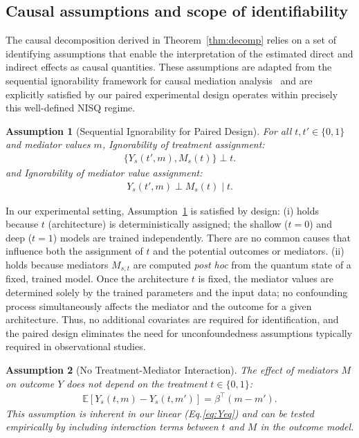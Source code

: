 \documentclass[
    reprint,
    amsmath, amssymb,
    aps,
    floatfix,
    nofootinbib
]{revtex4-1}
\newtheorem{assumption}{Assumption}
\begin{document}
\subsection{Causal assumptions and scope of identifiability}
\label{subsec:assumptions}

The causal decomposition derived in Theorem~\ref{thm:decomp} relies on a set of identifying assumptions that enable the interpretation of the estimated direct and indirect effects as causal quantities. These assumptions are adapted from the sequential ignorability framework for causal mediation analysis~\cite{imai2010general} and are explicitly satisfied by our paired experimental design operates within precisely this well-defined NISQ regime. \cite{chen2023complexity}

\begin{assumption}[Sequential Ignorability for Paired Design]
\label{ass:SI}
For all $t, t' \in \{0,1\}$ and mediator values $m$,
Ignorability of treatment assignment:
    \begin{align*}
        \{Y_{s}(t', m), M_{s}(t)\} \perp t.
    \end{align*}
and  Ignorability of mediator value assignment:
    \begin{align*}
        Y_{s}(t', m) \perp M_{s}(t) \mid  t.
    \end{align*}
\end{assumption}
In our experimental setting, Assumption~\ref{ass:SI} is satisfied by design:  (i) holds because $t$ (architecture) is deterministically assigned; the shallow ($t=0$) and deep ($t=1$) models are trained independently. There are no common causes that influence both the assignment of $t$ and the potential outcomes or mediators. (ii) holds because mediators $M_{s,t}$ are computed \textit{post hoc} from the quantum state of a fixed, trained model. Once the architecture $t$ is fixed, the mediator values are determined solely by the trained parameters and the input data; no confounding process simultaneously affects the mediator and the outcome for a given architecture. Thus, no additional covariates are required for identification, and the paired design eliminates the need for unconfoundedness assumptions typically required in observational studies.

\begin{assumption}[No Treatment-Mediator Interaction]
\label{ass:nointeraction}
The effect of mediators $M$ on outcome $Y$ does not depend on the treatment $t \in \{0,1\}$:
\begin{align}
    \mathbb{E}[Y_{s}(t, m) - Y_{s}(t, m')] = \beta^\top (m - m').
\end{align}
This assumption is inherent in our linear (Eq.\ref{eq:Yeq}) and can be tested empirically by including interaction terms between $t$ and $M$ in the outcome model.
\end{assumption}
\end{document}

